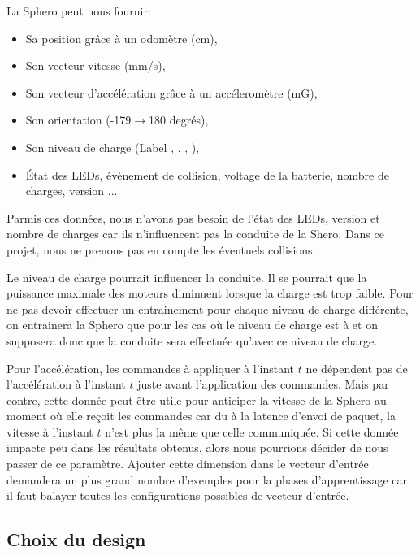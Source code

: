 \documentclass[12pt,a4paper,oneside, titlepage]{article}
\begin{document}
La Sphero peut nous fournir:\cite{SDKofficiels}
\begin{itemize}%
 \item Sa position grâce à un odomètre (cm),
 \item Son vecteur vitesse (mm/s),
 \item Son vecteur d'accélération grâce à un accéleromètre (mG),
 \item Son orientation (-179$\rightarrow$180 degrés),
 \item Son niveau de charge (Label , , , ),
 \item État des LEDs, évènement de collision, voltage de la batterie, nombre de charges, version ...
\end{itemize}

Parmis ces données, nous n'avons pas besoin de l'état des LEDs, version et nombre de charges car ils n'influencent pas la conduite de la Shero.
Dans ce projet, nous ne prenons pas en compte les éventuels collisions.

Le niveau de charge pourrait influencer la conduite.
Il se pourrait que la puissance maximale des moteurs diminuent lorsque la charge est trop faible.
Pour ne pas devoir effectuer un entrainement pour chaque niveau de charge différente, on entrainera la Sphero que pour les cas où le niveau de charge est à  et on supposera donc que la conduite sera effectuée qu'avec ce niveau de charge.

Pour l'accélération, les commandes à appliquer à l'instant $t$ ne dépendent pas de l'accélération à l'instant $t$ juste avant l'application des commandes.
Mais par contre, cette donnée peut être utile pour anticiper la vitesse de la Sphero au moment où elle reçoit les commandes car du à la latence d'envoi de paquet, la vitesse à l'instant $t$ n'est plus la même que celle communiquée.
Si cette donnée impacte peu dans les résultats obtenus, alors nous pourrions décider de nous passer de ce paramètre.
Ajouter cette dimension dans le vecteur d'entrée demandera un plus grand nombre d'exemples pour la phases d'apprentissage car il faut balayer toutes les configurations possibles de vecteur d'entrée.

\subsection{Choix du design}
\end{document}
